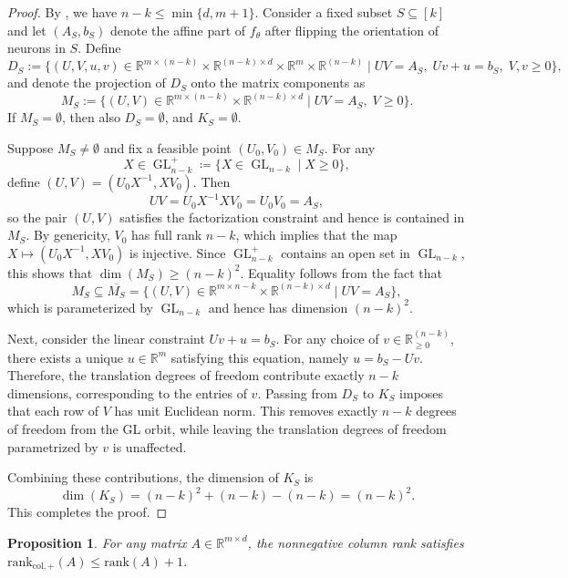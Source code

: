 \documentclass{article}
\newtheorem{prop}[theorem]{Proposition}
\theoremstyle{definition}
\newcommand{\R}{\mathbb{R}}
\newcommand{\nncr}[1]{\mathrm{rank}_{\mathrm{col},+}(#1)}
\DeclareMathOperator{\GL}{GL}
\begin{document}
\begin{proof} 
By , we have
$n-k \le \min\{d,m+1\}$. 
Consider a fixed subset $S \subseteq [k]$ and let $(A_S, b_S)$ denote the affine part of $f_\theta$ after flipping the orientation of neurons in $S$. 
Define 
\[
D_S := \{(U,V,u,v) \in \R^{m \times (n-k)} \times \R^{(n-k) \times d} \times \R^m \times \R^{(n-k)} \mid UV = A_S, \; Uv+u = b_S, \; V,v \ge 0\},
\]
and denote the projection of $D_S$ onto the matrix components as 
\[
M_S := \{(U,V) \in \R^{m \times (n-k)} \times \R^{(n-k) \times d} \mid U V = A_S, \; V \ge 0\} . 
\]
%
If $M_S=\emptyset$, then also $D_S = \emptyset$, and $K_S = \emptyset$. 

Suppose $M_S\neq\emptyset$ and fix a feasible point $(U_0,V_0) \in M_S$. 
%
For any $$X \in \GL_{n-k}^+ \coloneqq \{ X \in \GL_{n-k} \mid X \geq 0\},$$ define $(U,V) = (U_0 X^{-1}, X V_0)$. Then $$U V = U_0 X^{-1} X V_0 = U_0 V_0 = A_S,$$ so the pair $(U,V)$ satisfies the factorization constraint and hence is contained in $M_S$. By genericity, $V_0$ has full rank $n-k$, which implies that the map $X \mapsto (U_0 X^{-1}, X V_0)$ is injective. Since $\GL_{n-k}^+$ contains an open set in $\GL_{n-k}$, this shows that 
$\dim(M_S) \ge (n-k)^2$. 
Equality follows from the fact that $$M_S \subseteq \overline{M_S} = \{(U,V) \in \R^{m \times n-k} \times \R^{(n-k) \times d} \mid U V = A_S\},$$ which is parameterized by $\GL_{n-k}$ and hence has dimension $(n-k)^2$.

Next, consider the linear constraint $U v + u = b_S$. For any choice of $v \in \R_{\geq 0}^{(n-k)}$, there exists a unique $u \in \R^m$ satisfying this equation, namely $u = b_S - Uv$. 
Therefore, the translation degrees of freedom contribute exactly $n-k$ dimensions, corresponding to the entries of $v$. 
Passing from $D_S$ to $K_S$ imposes that each row of $V$ has unit Euclidean norm. This removes exactly $n-k$ degrees of freedom from the GL orbit, while leaving the translation degrees of freedom parametrized by $v$ is unaffected. 

Combining these contributions, the dimension of $K_S$ is
$$
\dim(K_S) = (n-k)^2 + (n-k) - (n-k) = (n-k)^2.
$$
%
This completes the proof. 
\end{proof}




\begin{prop}
\label{prop:nnrc<rank+1}
For any matrix \(A \in \mathbb{R}^{m \times d}\), 
the nonnegative column rank satisfies \(\nncr{A} \le \mathrm{rank}(A) + 1\). 
\end{prop}
\end{document}
